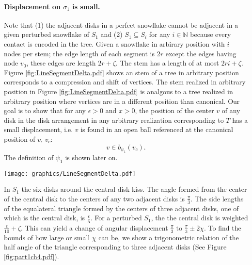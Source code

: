 \documentclass[10pt]{CSUNthesis}
\theoremstyle{plain}%
\theoremstyle{definition}
\theoremstyle{remark}
\newcommand{\bbN}{{\mathbb{N}}}
\begin{document}
\paragraph{Displacement on $\sigma_1$ is small.}
Note that (1) the adjacent disks in a perfect snowflake cannot be adjacent in a given perturbed snowflake of $S_1$ and (2) $S_1 \subseteq S_i$ for any $i \in \bbN$ because every contact is encoded in the tree.  
Given a snowflake in arbirary position with $i$ nodes per stem; the edge length of each segment is $2r$ except the edges having node $v_0$, these edges are length $2r+ \zeta$.  
The stem has a length of at most $2ri+\zeta$.
Figure \ref{fig:LineSegmentDelta.pdf} shows an stem of a tree in arbitrary position corresponds to a compression and shift of vertices.  
The stem realized in arbitrary position in Figure \ref{fig:LineSegmentDelta.pdf} is analgous to a tree realized in arbitrary position where vertices are in a different position than canonical.  
Our goal is to show that for any $\epsilon >0$ and $x >0$, the position of the center $v$ of any disk in the disk arrangement in any arbitrary realization corresponding to $T$ has a small displacement, i.e. $v$ is found in an open ball referenced at the canonical position of $v$, $v_c$: $$v \in b_{\psi_1}(v_c).$$ 
The definition of $\psi_1$ is shown later on.

\begin{minipage}{\linewidth}
\begin{center}
\texttt{[image: graphics/LineSegmentDelta.pdf]}
\label{fig:LineSegmentDelta.pdf}
\end{center}
\end{minipage}
 
In $S_1$ the six disks around the central disk kiss.  
The angle formed from the center of the central disk to the centers of any two adjacent disks is $\frac{\pi}{3}$.  
The side lengths of the equalateral triangle formed by the centers of three adjacent disks, one of which is the central disk, is $\frac{\epsilon}{5}$.  
For a perturbed $S_1$, the the central disk is weighted $\frac{\epsilon}{10} + \zeta$.  
This can yield a change of angular displacement $\frac{\pi}{3}$ to $\frac{\pi}{3} \pm 2\chi$.  
To find the bounds of how large or small $\chi$ can be, we show a trigonometric relation of the half angle of the triangle corresponding to three adjacent disks (See Figure \ref{fig:part1ch4.pdf}).
\end{document}
